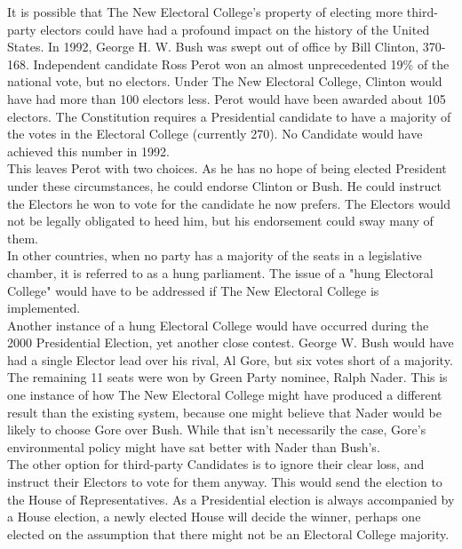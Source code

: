 \documentclass{article}
\begin{document}
    It is possible that The New Electoral College's property of electing more third-party electors could have had a profound impact on the history of the United States. In 1992, George H. W. Bush was swept out of office by Bill Clinton, 370-168. Independent candidate Ross Perot won an almost unprecedented 19\% of the national vote, but no electors. Under The New Electoral College, Clinton would have had more than 100 electors less. Perot would have been awarded about 105 electors. The Constitution requires a Presidential candidate to have a majority of the votes in the Electoral College (currently 270). No Candidate would have achieved this number in 1992.\\
    
    This leaves Perot with two choices. As he has no hope of being elected President under these circumstances, he could endorse Clinton or Bush. He could instruct the Electors he won to vote for the candidate he now prefers. The Electors would not be legally obligated to heed him, but his endorsement could sway many of them.\\
    
    In other countries, when no party has a majority of the seats in a legislative chamber, it is referred to as a hung parliament. The issue of a "hung Electoral College" would have to be addressed if The New Electoral College is implemented.\\
    
    Another instance of a hung Electoral College would have occurred during the 2000 Presidential Election, yet another close contest. George W. Bush would have had a single Elector lead over his rival, Al Gore, but six votes short of a majority. The remaining 11 seats were won by Green Party nominee, Ralph Nader. This is one instance of how The New Electoral College might have produced a different result than the existing system, because one might believe that Nader would be likely to choose Gore over Bush. While that isn't necessarily the case, Gore's environmental policy might have sat better with Nader than Bush's.\\

    The other option for third-party Candidates is to ignore their clear loss, and instruct their Electors to vote for them anyway. This would send the election to the House of Representatives. As a Presidential election is always accompanied by a House election, a newly elected House will decide the winner, perhaps one elected on the assumption that there might not be an Electoral College majority.\\
\end{document}
